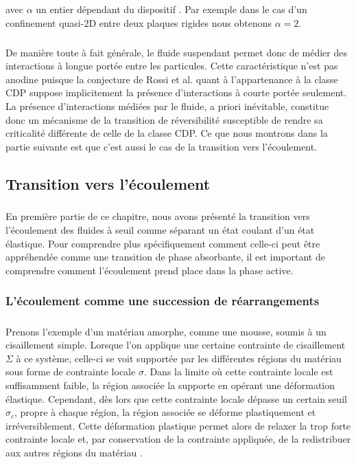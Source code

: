 \noindent avec $\alpha$ un entier dépendant du dispositif \cite{diamant_hydrodynamic_2009}. Par exemple dans le cas d'un confinement quasi-2D entre deux plaques rigides nous obtenons $\alpha = 2$.

\subparagraph{}De manière toute à fait générale, le fluide suspendant permet donc de médier des interactions à longue portée entre les particules. Cette caractéristique n'est pas anodine puisque la conjecture de Rossi et al. \cite{rossi_universality_2000} quant à l'appartenance à la classe CDP suppose implicitement la présence d'interactions à courte portée seulement. La présence d'interactions médiées par le fluide, a priori inévitable, constitue donc un mécanisme de la transition de réversibilité susceptible de rendre sa criticalité différente de celle de la classe CDP. Ce que nous montrons dans la partie suivante est que c'est aussi le cas de la transition vers l'écoulement.

\subsection{Transition vers l'écoulement}

\label{sec:yieldingCDP}

\subparagraph{}En première partie de ce chapitre, nous avons présenté la transition vers l'écoulement des fluides à seuil comme séparant un état coulant d'un état élastique. Pour comprendre plus spécifiquement comment celle-ci peut être appréhendée comme une transition de phase absorbante, il est important de comprendre comment l'écoulement prend place dans la phase active.

\subsubsection{L'écoulement comme une succession de réarrangements}

\subparagraph{}Prenons l'exemple d'un matériau amorphe, comme une mousse, soumis à un cisaillement simple. Lorsque l'on applique une certaine contrainte de cisaillement $\Sigma$ à ce système, celle-ci se voit supportée par les différentes régions du matériau sous forme de contrainte locale $\sigma$. Dans la limite où cette contrainte locale est suffisamment faible, la région associée la supporte en opérant une déformation élastique. Cependant, dès lors que cette contrainte locale dépasse un certain seuil $\sigma_c$, propre à chaque région, la région associée se déforme plastiquement et irréversiblement. Cette déformation plastique permet alors de relaxer la trop forte contrainte locale et, par conservation de la contrainte appliquée, de la redistribuer aux autres régions du matériau \cite{nicolas_deformation_2018}. 

